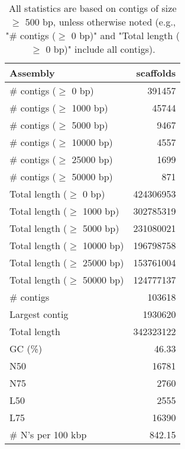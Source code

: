 \documentclass[12pt,a4paper]{article}
\begin{document}
\begin{table}[ht]
\begin{center}
\caption{All statistics are based on contigs of size $\geq$ 500 bp, unless otherwise noted (e.g., "\# contigs ($\geq$ 0 bp)" and "Total length ($\geq$ 0 bp)" include all contigs).}
\begin{tabular}{|l*{1}{|r}|}
\hline
Assembly & scaffolds \\ \hline
\# contigs ($\geq$ 0 bp) & 391457 \\ \hline
\# contigs ($\geq$ 1000 bp) & 45744 \\ \hline
\# contigs ($\geq$ 5000 bp) & 9467 \\ \hline
\# contigs ($\geq$ 10000 bp) & 4557 \\ \hline
\# contigs ($\geq$ 25000 bp) & 1699 \\ \hline
\# contigs ($\geq$ 50000 bp) & 871 \\ \hline
Total length ($\geq$ 0 bp) & 424306953 \\ \hline
Total length ($\geq$ 1000 bp) & 302785319 \\ \hline
Total length ($\geq$ 5000 bp) & 231080021 \\ \hline
Total length ($\geq$ 10000 bp) & 196798758 \\ \hline
Total length ($\geq$ 25000 bp) & 153761004 \\ \hline
Total length ($\geq$ 50000 bp) & 124777137 \\ \hline
\# contigs & 103618 \\ \hline
Largest contig & 1930620 \\ \hline
Total length & 342323122 \\ \hline
GC (\%) & 46.33 \\ \hline
N50 & 16781 \\ \hline
N75 & 2760 \\ \hline
L50 & 2555 \\ \hline
L75 & 16390 \\ \hline
\# N's per 100 kbp & 842.15 \\ \hline
\end{tabular}
\end{center}
\end{table}
\end{document}
